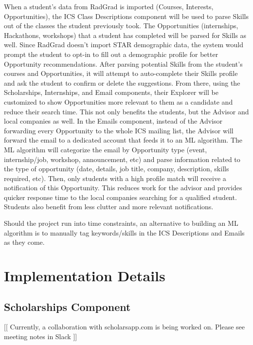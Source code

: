 \documentclass[english]{proposalnsf}
\begin{document}
	When a student’s data from RadGrad is imported (Courses, Interests, Opportunities), the ICS Class Descriptions component will be used to parse Skills out of the classes the student previously took. The Opportunities (internships, Hackathons, workshops) that a student has completed will be parsed for Skills as well. Since RadGrad doesn’t import STAR demographic data, the system would prompt the student to opt-in to fill out a demographic profile for better Opportunity recommendations. After parsing potential Skills from the student’s courses and Opportunities, it will attempt to auto-complete their Skills profile and ask the student to confirm or delete the suggestions. From there, using the Scholarships, Internships, and Email components, their Explorer will be customized to show Opportunities more relevant to them as a candidate and reduce their search time. This not only benefits the students, but the Advisor and local companies as well. In the Emails component, instead of the Advisor forwarding every Opportunity to the whole ICS mailing list, the Advisor will forward the email to a dedicated account that feeds it to an ML algorithm. The ML algorithm will categorize the email by Opportunity type (event, internship/job, workshop, announcement, etc) and parse information related to the type of opportunity (date, details, job title, company, description, skills required, etc). Then, only students with a high profile match will receive a notification of this Opportunity. This reduces work for the advisor and provides quicker response time to the local companies searching for a qualified student. Students also benefit from less clutter and more relevant notifications. 
	
	Should the project run into time constraints, an alternative to building an ML algorithm is to manually tag keywords/skills in the ICS Descriptions and Emails as they come.
	
	
	\section{Implementation Details}
	\label{implementation-details}
	
	\subsection{Scholarships Component}
	
	[[ Currently, a collaboration with scholarsapp.com is being worked on. Please see meeting notes in Slack ]]
	
\end{document}

